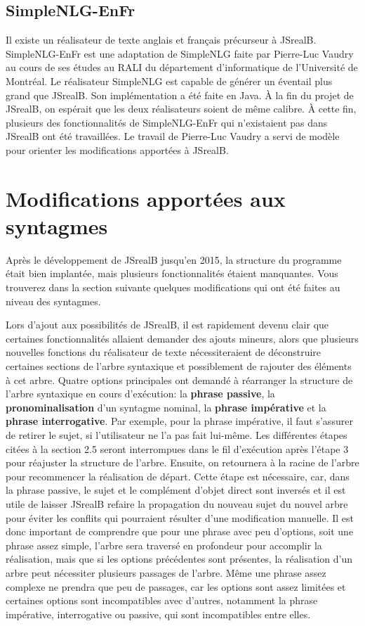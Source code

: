 \documentclass[11pt]{article} %
\newcommand{\system}[1]{\textsf{#1}}
\newcommand{\JSB}{\system{JSrealB}}
\begin{document}
\subsection{\system{SimpleNLG-EnFr}}

Il existe un réalisateur de texte anglais et français précurseur à
\JSB{}. SimpleNLG-EnFr est une adaptation de \system{SimpleNLG} faite par Pierre-Luc
Vaudry au cours de ses études au RALI du département d'informatique
de l'Université de Montréal. Le réalisateur \system{SimpleNLG} est capable
de générer un éventail plus grand que \JSB{}. Son implémentation
a été faite en Java. À la fin du projet de \JSB{}, on espérait que
les deux réalisateurs soient de même calibre. À cette fin, plusieurs
des fonctionnalités de \system{SimpleNLG-EnFr} qui n'existaient pas dans \JSB{}
ont été travaillées. Le travail de Pierre-Luc Vaudry a servi de modèle
pour orienter les modifications apportées à \JSB{}.

\section{Modifications apportées aux syntagmes}
Après le développement de \JSB{} jusqu'en 2015, la structure du programme
était bien implantée, mais plusieurs fonctionnalités étaient manquantes.
Vous trouverez dans la section suivante quelques modifications qui
ont été faites au niveau des syntagmes.

Lors d'ajout aux possibilités de \JSB{}, il est rapidement devenu
clair que certaines fonctionnalités allaient demander des ajouts mineurs,
alors que plusieurs nouvelles fonctions du réalisateur de texte nécessiteraient
de déconstruire certaines sections de l'arbre syntaxique et possiblement
de rajouter des éléments à cet arbre. Quatre options principales ont
demandé à réarranger la structure de l'arbre syntaxique en cours d'exécution:
la \textbf{phrase passive}, la \textbf{pronominalisation} d'un syntagme
nominal, la \textbf{phrase impérative} et la \textbf{phrase interrogative}.
Par exemple, pour la phrase impérative, il faut s'assurer de retirer
le sujet, si l'utilisateur ne l'a pas fait lui-même. Les différentes
étapes citées à la section 2.5 seront interrompues dans le fil d'exécution
après l'étape 3 pour réajuster la structure de l'arbre. Ensuite, on
retournera à la racine de l'arbre pour recommencer la réalisation
de départ. Cette étape est nécessaire, car, dans la phrase passive,
le sujet et le complément d'objet direct sont inversés et il est utile
de laisser \JSB{} refaire la propagation du nouveau sujet du nouvel
arbre pour éviter les conflits qui pourraient résulter d'une modification
manuelle. Il est donc important de comprendre que pour une phrase
avec peu d'options, soit une phrase assez simple, l'arbre sera traversé
en profondeur pour accomplir la réalisation, mais que si les options
précédentes sont présentes, la réalisation d'un arbre peut nécessiter
plusieurs passages de l'arbre. Même une phrase assez complexe
ne prendra que peu de passages, car les options sont assez limitées
et certaines options sont incompatibles avec d'autres, notamment la
phrase impérative, interrogative ou passive, qui sont incompatibles
entre elles.
\end{document}
